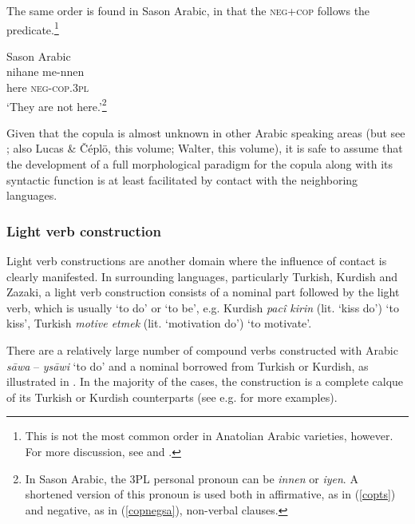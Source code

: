 \documentclass[output=paper]{langsci/langscibook}
\begin{document}
\noindent  The same order is found in Sason Arabic, in that the \textsc{neg+cop} follows the predicate.\footnote{This is not the most common order in Anatolian Arabic varieties, however. For more discussion, see \cite{Jastrow2011anatolian} and \cite{Akkus2016,Akkus2017}.} 

\begin{exe}
\ex Sason Arabic \\ \label{copnegsa} \gll  nihane me-nnen	\\
        here 	\textsc{neg-cop.3pl} \\
        \glt `They  are not here.'\footnote{In Sason Arabic, the 3PL personal pronoun can be \textit{innen} or \textit{iyen}. A shortened version of this pronoun is used both in affirmative, as in (\ref{copts}) and negative, as in (\ref{copnegsa}), non-verbal clauses. }
\end{exe}
	
\noindent Given that the copula is almost unknown in other Arabic speaking areas (but see \citealt{Blanc1964}; also Lucas \& Čéplö, this volume; Walter, this volume), it is safe to assume that the development of a full morphological paradigm for the copula along with its syntactic function is at least facilitated by contact with the neighboring languages.


\subsubsection{Light verb construction}

Light verb constructions are another domain where the influence of contact is clearly manifested. In surrounding languages, particularly Turkish, Kurdish and Zazaki, a light verb construction consists of a nominal part followed by the light verb, which is usually `to do' or `to be', e.g. Kurdish \textit{pacî kirin} (lit. `kiss do') `to kiss', Turkish \textit{motive etmek} (lit. `motivation do') `to motivate’. 

There are a relatively large number of compound verbs constructed with Arabic \textit{s\={a}wa} – \textit{ys\={a}wi} `to do' and a nominal borrowed from Turkish or Kurdish, as illustrated in . In the majority of the cases, the construction is a complete calque of its Turkish or Kurdish counterparts (see e.g. \citealt{Versteegh1997,Lahdo2009,Grigore2007article,Talay2007,Jastrow2011anatolian,Akkus2016,Akkus2017,AkkusBenmamoun2018,Bituna2016} for more examples).
\end{document}
